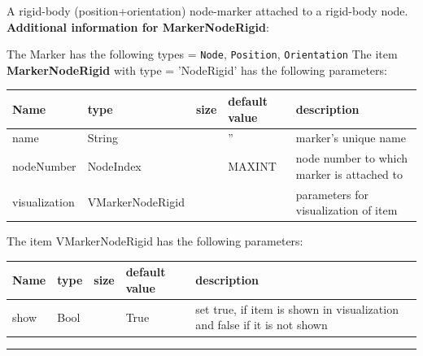 \ei

%
\newpage

\label{sec:item:MarkerNodeRigid}
A rigid-body (position+orientation) node-marker attached to a rigid-body node.\vspace{12pt}
 \\{\bf Additional information for MarkerNodeRigid}:
\bi
  \item The Marker has the following types = \texttt{Node}, \texttt{Position}, \texttt{Orientation}
\ei
\vspace{12pt} \noindent The item {\bf MarkerNodeRigid} with type = 'NodeRigid' has the following parameters:\vspace{-1cm}\\ 
\begin{center}
  \footnotesize
  \begin{longtable}{| p{4.5cm} | p{2.5cm} | p{0.5cm} | p{2.5cm} | p{6cm} |}
    \hline
    \bf Name & \bf type & \bf size & \bf default value & \bf description \\ \hline
    name &     String &      &     '' &     marker's unique name\\ \hline
    nodeNumber &     NodeIndex &      &     MAXINT &     node number to which marker is attached to\\ \hline
    visualization & VMarkerNodeRigid & & & parameters for visualization of item \\ \hline
	  \end{longtable}
	\end{center}
The item VMarkerNodeRigid has the following parameters:\vspace{-1cm}\\ 
\begin{center}
  \footnotesize
  \begin{longtable}{| p{4.5cm} | p{2.5cm} | p{0.5cm} | p{2.5cm} | p{6cm} |}
    \hline
    \bf Name & \bf type & \bf size & \bf default value & \bf description \\ \hline
    show &     Bool &      &     True &     set true, if item is shown in visualization and false if it is not shown\\ \hline
	  \end{longtable}
	\end{center}
\par\noindent\rule{\textwidth}{0.4pt}
\label{description_MarkerNodeRigid}
